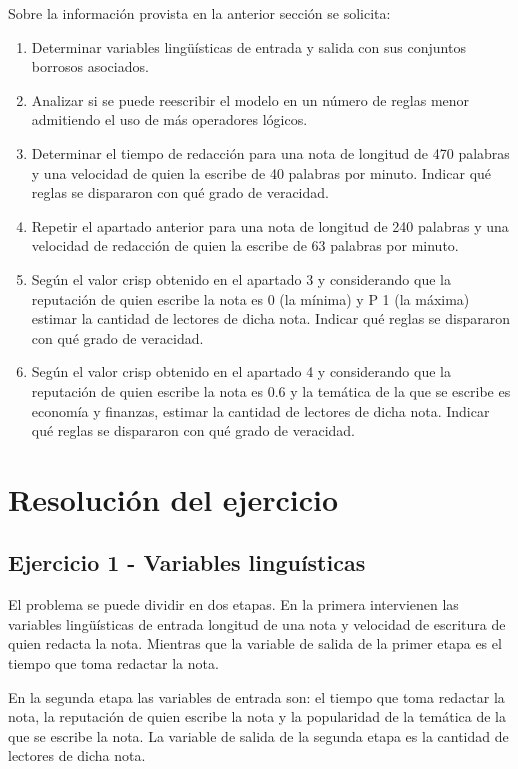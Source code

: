 \documentclass{article}
\begin{document}
Sobre la información provista en la anterior sección se solicita:

\begin{enumerate}
	\item Determinar variables lingüísticas de entrada y salida con sus conjuntos borrosos asociados.
	\item Analizar si se puede reescribir el modelo en un número de reglas menor admitiendo el uso de más operadores lógicos.
	\item Determinar el tiempo de redacción para una nota de longitud de 470 palabras y una velocidad de quien la escribe de 40 palabras por minuto. Indicar qué reglas se dispararon con qué grado de veracidad.
	\item Repetir el apartado anterior para una nota de longitud de 240 palabras y una velocidad de redacción de quien la escribe de 63 palabras por minuto.
	\item Según el valor crisp obtenido en el apartado 3 y considerando que la reputación de quien escribe la nota es 0 (la mínima) y P 1 (la máxima) estimar la cantidad de lectores de dicha nota. Indicar qué reglas se dispararon con qué grado de veracidad.
	\item Según el valor crisp obtenido en el apartado 4 y considerando que la reputación de quien escribe la nota es 0.6 y la temática de la que se escribe es economía y finanzas, estimar la cantidad de lectores de dicha nota. Indicar qué reglas se dispararon con qué grado de veracidad.
\end{enumerate}

\pagebreak
\section*{Resolución del ejercicio}

\subsection*{Ejercicio 1 - Variables linguísticas}
El problema se puede dividir en dos etapas. En la primera intervienen las variables lingüísticas de entrada longitud de una nota y velocidad de escritura de quien redacta la nota. Mientras que la variable de salida de la primer etapa es el tiempo que toma redactar la nota.

\vspace{3mm}
En la segunda etapa las variables de entrada son: el tiempo que toma redactar la nota, la reputación de quien escribe la nota y la popularidad de la temática de la que se escribe la nota. La variable de salida de la segunda etapa es la cantidad de lectores de dicha nota.
\end{document}
